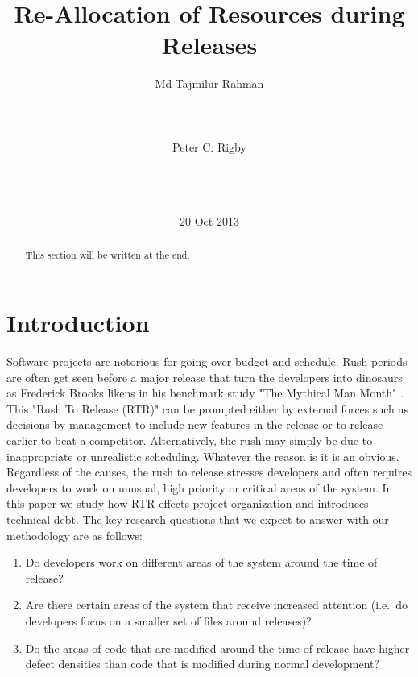 \documentclass{acm_proc_article-sp}
\begin{document}
\title{Re-Allocation of Resources during Releases }
\author{
\alignauthor
Md Tajmilur Rahman\\
       \\
       \\
       \\
\alignauthor
Peter C. Rigby\\
       \\
       \\
       \\
}
\date{20 Oct 2013}
\maketitle
\begin{abstract}
This section will be written at the end.
\end{abstract}
\section{Introduction}
Software projects are notorious for going over budget and schedule. Rush periods are often get seen before a major release that turn the developers into dinosaurs as Frederick Brooks likens in his benchmark study "The Mythical Man Month" \cite{1_brooks}. This "Rush To Release (RTR)" can be prompted either by external forces such as decisions by management to include new features in the release or to release earlier to beat a competitor. Alternatively, the rush may simply be due to inappropriate or unrealistic scheduling. Whatever the reason is it is an obvious. Regardless of the causes, the rush to release stresses developers and often requires developers to work on unusual, high priority or critical areas of the system. In this paper we study how RTR effects project organization and introduces technical debt. The key research questions that we expect to answer with our methodology are as follows:
\begin{enumerate}
\item Do developers work on different areas of the system around the time of release?
\item Are there certain areas of the system that receive increased attention (i.e.\ do developers focus on a smaller set of files around releases)?
\item Do the areas of code that are modified around the time of release have higher defect densities than code that is modified during normal development?
\end{enumerate}
\end{document}
